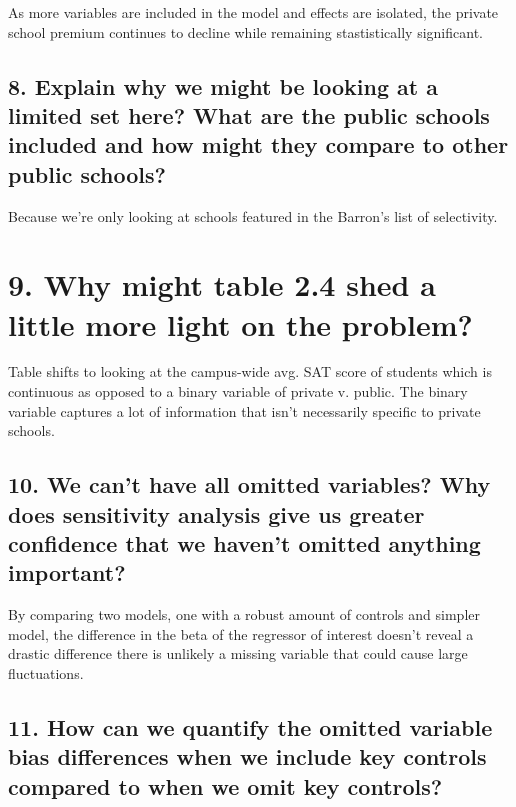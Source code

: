 \documentclass[
]{article}
\begin{document}
As more variables are included in the model and effects are isolated,
the private school premium continues to decline while remaining
stastistically significant.

\subsection{8. Explain why we might be looking at a limited set here?
What are the public schools included and how might they compare to other
public
schools?}\label{explain-why-we-might-be-looking-at-a-limited-set-here-what-are-the-public-schools-included-and-how-might-they-compare-to-other-public-schools}

Because we're only looking at schools featured in the Barron's list of
selectivity.

\section{9. Why might table 2.4 shed a little more light on the
problem?}\label{why-might-table-2.4-shed-a-little-more-light-on-the-problem}

Table shifts to looking at the campus-wide avg. SAT score of students
which is continuous as opposed to a binary variable of private v.
public. The binary variable captures a lot of information that isn't
necessarily specific to private schools.

\subsection{10. We can't have all omitted variables? Why does
sensitivity analysis give us greater confidence that we haven't omitted
anything
important?}\label{we-cant-have-all-omitted-variables-why-does-sensitivity-analysis-give-us-greater-confidence-that-we-havent-omitted-anything-important}

By comparing two models, one with a robust amount of controls and
simpler model, the difference in the beta of the regressor of interest
doesn't reveal a drastic difference there is unlikely a missing variable
that could cause large fluctuations.

\subsection{11. How can we quantify the omitted variable bias
differences when we include key controls compared to when we omit key
controls?}\label{how-can-we-quantify-the-omitted-variable-bias-differences-when-we-include-key-controls-compared-to-when-we-omit-key-controls}
\end{document}
